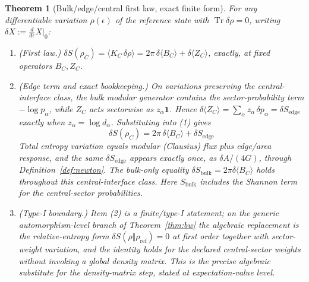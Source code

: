 \documentclass[11pt]{article}
\newtheorem{theorem}{Theorem}[section]
\begin{document}
\begin{theorem}[Bulk/edge/central first law, exact finite form]
\label{thm:bulk-edge-central-first-law}
For any differentiable variation \(\rho(\epsilon)\) of the reference state
with \(\operatorname{Tr}\delta\rho=0\), writing
\(\delta X:=\tfrac{d}{d\epsilon}X|_{0}\):
\begin{enumerate}[leftmargin=2em]
\item (\emph{First law.})
\(\delta S(\rho_C)=\langle K_C\,\delta\rho\rangle
=2\pi\,\delta\langle B_C\rangle+\delta\langle Z_C\rangle\),
exactly, at fixed operators \(B_C,Z_C\).
\item (\emph{Edge term and exact bookkeeping.}) On
variations preserving the central-interface class, the bulk modular generator
contains the sector-probability term \(-\log p_\alpha\), while \(Z_C\) acts
sectorwise as \(z_\alpha\mathbf 1\). Hence
\(\delta\langle Z_C\rangle=\sum_\alpha z_\alpha\,\delta p_\alpha
=\delta S_{\mathrm{edge}}\)
exactly when \(z_\alpha=\log d_\alpha\). Substituting into (1) gives
\[
\boxed{\;\delta S(\rho_C)
=2\pi\,\delta\langle B_C\rangle+\delta S_{\mathrm{edge}}\;}
\]
Total entropy variation equals modular (Clausius) flux plus edge/area response,
and the same \(\delta S_{\mathrm{edge}}\) appears
exactly once, as \(\delta A/(4G)\), through Definition~\ref{def:newton}. The
bulk-only equality \(\delta S_{\mathrm{bulk}}=2\pi\delta\langle B_C\rangle\)
holds throughout this central-interface class. Here
\(S_{\mathrm{bulk}}\) includes the Shannon term for the central-sector
probabilities.
\item (\emph{Type-I boundary.}) Item (2) is a finite/type-I statement; on the
generic automorphism-level branch of Theorem~\ref{thm:bw} the algebraic
replacement is the relative-entropy form
\(\delta S(\rho\Vert\rho_{\mathrm{ref}})=0\) at first order together with
sector-weight variation, and the identity holds for the declared
central-sector weights without invoking a global density matrix. This is the
precise algebraic substitute for the density-matrix step, stated at
expectation-value level.
\end{enumerate}
\end{theorem}
\end{document}
